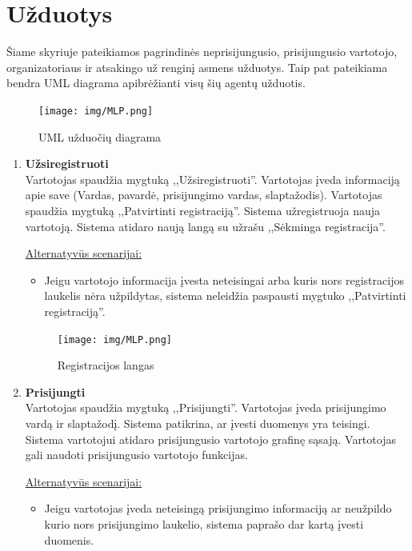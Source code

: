 \documentclass{VUMIFPSkursinis}
\begin{document}
    \section{Užduotys}\label{uzduotys}
		Šiame skyriuje pateikiamos pagrindinės neprisijungusio, prisijungusio vartotojo, organizatoriaus ir atsakingo už renginį asmens užduotys.
		Taip pat pateikiama bendra UML diagrama apibrėžianti visų šių agentų užduotis.
			\noindent
			
			\begin{figure}[H]
                \centering
                \texttt{[image: img/MLP.png]}
                \caption{UML užduočių diagrama}
                \label{fig:uzduociu-diagrama}
            \end{figure}

		\begin{enumerate} [label = \textbf{U\arabic*.}]
			\item \textbf{Užsiregistruoti} \\
				Vartotojas spaudžia mygtuką ,,Užsiregistruoti''.
				Vartotojas įveda informaciją apie save (Vardas, pavardė, prisijungimo vardas, slaptažodis).
				Vartotojas spaudžia mygtuką ,,Patvirtinti registraciją''. 
				Sistema užregistruoja nauja vartotoją. Sistema atidaro naują langą su užrašu ,,Sėkminga registracija''.
				
				\underline{Alternatyvūs scenarijai:}
				\begin{itemize}
					\item Jeigu vartotojo informacija įvesta neteisingai arba kuris nors registracijos laukelis nėra užpildytas, 
					sistema neleidžia paspausti mygtuko ,,Patvirtinti registraciją''. 
				\end{itemize}

				\begin{figure}[H]
					\centering
					\texttt{[image: img/MLP.png]}
					\caption{Registracijos langas}
					\label{fig:uzd_registracija}
				\end{figure}
				
			\item \textbf{Prisijungti} \\
				Vartotojas spaudžia mygtuką ,,Prisijungti''. 
				Vartotojas įveda prisijungimo vardą ir slaptažodį.	
				Sistema patikrina, ar įvesti duomenys yra teisingi. 
				Sistema vartotojui atidaro prisijungusio vartotojo grafinę sąsają. 
				Vartotojas gali naudoti prisijungusio vartotojo funkcijas.
				
				\underline{Alternatyvūs scenarijai:}
				\begin{itemize}
					\item Jeigu vartotojas įveda neteisingą prisijungimo informaciją ar neužpildo kurio nors prisijungimo laukelio, 
					sistema paprašo dar kartą įvesti duomenis.
				\end{itemize}
				

\end{enumerate}
\end{document}
